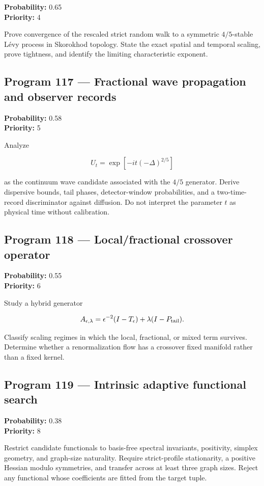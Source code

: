 \documentclass[11pt,a4paper,openany]{report}
\begin{document}
\textbf{Probability:} 0.65\\
\textbf{Priority:} 4

Prove convergence of the rescaled strict random walk to a symmetric \(4/5\)-stable Lévy process in Skorokhod topology. State the exact spatial and temporal scaling, prove tightness, and identify the limiting characteristic exponent.

\subsection{Program 117 --- Fractional wave propagation and observer records}

\textbf{Probability:} 0.58\\
\textbf{Priority:} 5

Analyze

\[
U_t=\exp[-it(-\Delta)^{2/5}]
\]

as the continuum wave candidate associated with the \(4/5\) generator. Derive dispersive bounds, tail phases, detector-window probabilities, and a two-time-record discriminator against diffusion. Do not interpret the parameter \(t\) as physical time without calibration.

\subsection{Program 118 --- Local/\allowbreak{}fractional crossover operator}

\textbf{Probability:} 0.55\\
\textbf{Priority:} 6

Study a hybrid generator

\[
A_{\epsilon,\lambda}
=
\epsilon^{-2}(I-T_\epsilon)
+\lambda(I-P_{\rm tail}).
\]

Classify scaling regimes in which the local, fractional, or mixed term survives. Determine whether a renormalization flow has a crossover fixed manifold rather than a fixed kernel.

\subsection{Program 119 --- Intrinsic adaptive functional search}

\textbf{Probability:} 0.38\\
\textbf{Priority:} 8

Restrict candidate functionals to basis-free spectral invariants, positivity, simplex geometry, and graph-size naturality. Require strict-profile stationarity, a positive Hessian modulo symmetries, and transfer across at least three graph sizes. Reject any functional whose coefficients are fitted from the target tuple.
\end{document}
